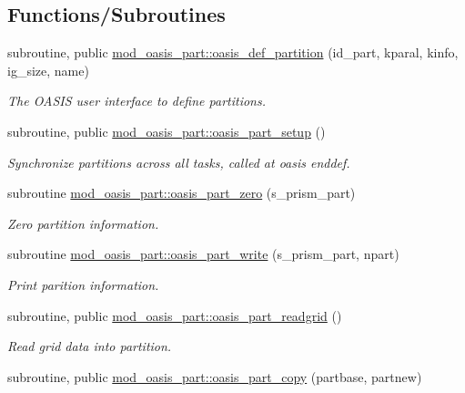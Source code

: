 \subsection*{Functions/\+Subroutines}
\begin{DoxyCompactItemize}
\item 
subroutine, public \hyperlink{namespacemod__oasis__part_af070605328f2b705735d7fbf8b838ff4}{mod\+\_\+oasis\+\_\+part\+::oasis\+\_\+def\+\_\+partition} (id\+\_\+part, kparal, kinfo, ig\+\_\+size, name)
\begin{DoxyCompactList}\small\item\em The O\+A\+S\+IS user interface to define partitions. \end{DoxyCompactList}\item 
subroutine, public \hyperlink{namespacemod__oasis__part_a80f66cc0ce5857aa53d070861f05b521}{mod\+\_\+oasis\+\_\+part\+::oasis\+\_\+part\+\_\+setup} ()
\begin{DoxyCompactList}\small\item\em Synchronize partitions across all tasks, called at oasis enddef. \end{DoxyCompactList}\item 
subroutine \hyperlink{namespacemod__oasis__part_a17c747bc29d25b558df42524bd63ac90}{mod\+\_\+oasis\+\_\+part\+::oasis\+\_\+part\+\_\+zero} (s\+\_\+prism\+\_\+part)
\begin{DoxyCompactList}\small\item\em Zero partition information. \end{DoxyCompactList}\item 
subroutine \hyperlink{namespacemod__oasis__part_a12edb4b0248a3f562fe5f6e16eede06a}{mod\+\_\+oasis\+\_\+part\+::oasis\+\_\+part\+\_\+write} (s\+\_\+prism\+\_\+part, npart)
\begin{DoxyCompactList}\small\item\em Print parition information. \end{DoxyCompactList}\item 
subroutine, public \hyperlink{namespacemod__oasis__part_ae5c72886d4078ff0cc8e4c87a4dfd43c}{mod\+\_\+oasis\+\_\+part\+::oasis\+\_\+part\+\_\+readgrid} ()
\begin{DoxyCompactList}\small\item\em Read grid data into partition. \end{DoxyCompactList}\item 
subroutine, public \hyperlink{namespacemod__oasis__part_aabbc667e6db4ed0a0d593749a396f392}{mod\+\_\+oasis\+\_\+part\+::oasis\+\_\+part\+\_\+copy} (partbase, partnew)

\end{DoxyCompactItemize}
